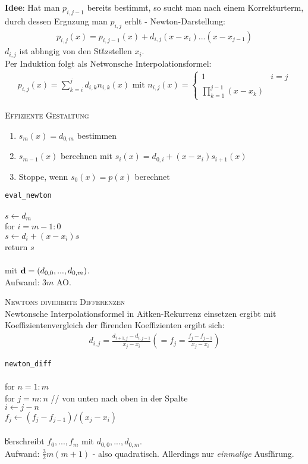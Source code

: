 \textbf{Idee}: Hat man $p_{i,j-1}$ bereits bestimmt, so sucht man nach einem Korrekturterm, durch dessen Erg\a nzung man $p_{i,j}$ erh\a lt - Newton-Darstellung:
\begin{align*}
p_{i,j}(x) = p_{i,j-1}(x) + d_{i,j}(x- x_i)...(x-x_{j-1})
\end{align*}
$d_{i,j}$ ist abh\a ngig von den St\u tzstellen $x_i$.\\

Per Induktion folgt als Netwonsche Interpolationsformel:
\begin{align*}
p_{i,j}(x) = \sum_{k=i}^j d_{i,k}n_{i,k}(x) \text{ mit }  n_{i,j}(x)=\begin{cases} 1 & i=j \\ \prod_{k=1}^{j-1}(x-x_k)&\end{cases}
\end{align*}

\textsc{Effiziente Gestaltung}\\
\begin{enumerate}
\item $s_m(x)=d_{0,m}$ bestimmen
\item $s_{m-1}(x)$ berechnen mit $s_i(x)=d_{0,i}+(x-x_i)s_{i+1}(x)$
\item Stoppe, wenn $s_0(x)=p(x)$ berechnet
\end{enumerate}

\verb!eval_newton!\\
{\addtolength{\leftskip}{0mm}
\hrulefill\\
$s \leftarrow d_m$ \\
for $i=m-1:0$ \\
\quad $s \leftarrow d_i+(x-x_i)s$ \\
return $s$  \\
\hrulefill\\
}
mit $\mbox{\bf d}=(d_{0,0},...,d_{0,m})$.\\
Aufwand: $3m$ AO. \vspace{0.2cm}

\textsc{Newtons dividierte Differenzen}\\
Newtonsche Interpolationsformel in Aitken-Rekurrenz einsetzen ergibt mit Koeffizientenvergleich der f\u hrenden Koeffizienten ergibt sich:
\begin{align*}
d_{i,j}=\frac{d_{i+1,j}-d_{i,j-1}}{x_j-x_i} \left(=f_j = \frac{f_j-f_{j-1}}{x_j-x_i}\right)
\end{align*}

\verb!newton_diff!\\
{\addtolength{\leftskip}{0mm}
\hrulefill\\
for $n=1:m$ \\
\quad for $j=m:n$ {\scriptsize // von unten nach oben in der Spalte} \\
\qquad $i \leftarrow j-n$\\
\qquad $f_j \leftarrow (f_j-f_{j-1})/(x_j-x_i)$\\
\hrulefill\\
}
\U berschreibt $f_0,...,f_m$ mit $d_{0,0},...,d_{0,m}$.\\
Aufwand: $\frac{3}{2}m(m+1)$ - also quadratisch. Allerdings nur \emph{einmalige} Ausf\u hrung.

